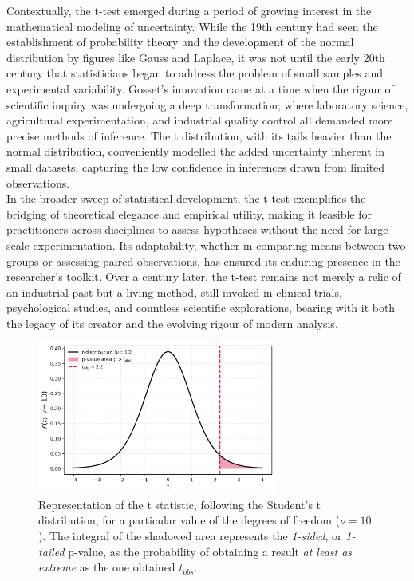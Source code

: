 \documentclass{book}
\begin{document}
Contextually, the t-test emerged during a period of growing interest in the mathematical modeling of uncertainty. While the 19th century had seen the establishment of probability theory and the development of the normal distribution by figures like Gauss and Laplace, it was not until the early 20th century that statisticians began to address the problem of small samples and experimental variability. Gosset’s innovation came at a time when the rigour of scientific inquiry was undergoing a deep transformation; where laboratory science, agricultural experimentation, and industrial quality control all demanded more precise methods of inference. The t distribution, with its tails heavier than the normal distribution, conveniently modelled the added uncertainty inherent in small datasets, capturing the low confidence in inferences drawn from limited observations.\\

In the broader sweep of statistical development, the t-test exemplifies the bridging of theoretical elegance and empirical utility, making it feasible for practitioners across disciplines to assess hypotheses without the need for large-scale experimentation. Its adaptability, whether in comparing means between two groups or assessing paired observations, has ensured its enduring presence in the researcher’s toolkit. Over a century later, the t-test remains not merely a relic of an industrial past but a living method, still invoked in clinical trials, psychological studies, and countless scientific explorations, bearing with it both the legacy of its creator and the evolving rigour of modern analysis.\\

\begin{figure}[ht]
    \centering
    \includegraphics[width=0.7\textwidth]{figures/chapter4/t_test_1_sample_p_one_tailed.png}
    \caption{Representation of the t statistic, following the Student's t distribution, for a particular value of the degrees of freedom ($\nu = 10$). The integral of the shadowed area represents the \textit{1-sided}, or \textit{1-tailed} p-value, as the probability of obtaining a result \textit{at least as extreme} as the one obtained $t_{obs}$.}
    \label{fig:t_test1}
\end{figure}
\end{document}
